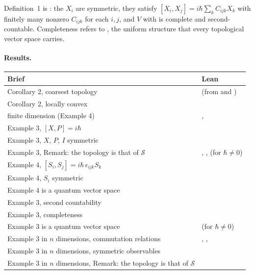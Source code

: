 \documentclass[11pt]{article}
\begin{document}
Definition~1 is : the $X_i$ are symmetric, they satisfy
$[X_i, X_j] = i\hbar \sum_k C_{ijk} X_k$ with finitely many nonzero $C_{ijk}$ for each $i, j$,
and $V$ with  is complete and second-countable. Completeness refers to
, the uniform structure that every topological vector space carries.

\paragraph{Results.}
\begin{xltabular}{\textwidth}{@{}BL@{}}
\toprule
Brief & Lean \\
\midrule
\endhead
Corollary 2, coarsest topology &  (from 
  and ) \\
Corollary 2, locally convex &  \\
finite dimension (Example 4) & ,  \\
Example 3, $[X, P] = i\hbar$ &  \\
Example 3, $X$, $P$, $I$ symmetric &  \\
Example 3, Remark: the topology is that of $\mathcal{S}$ & ,
  ,  (for $\hbar \ne 0$) \\
Example 4, $[S_i, S_j] = i\hbar\,\epsilon_{ijk} S_k$ &  \\
Example 4, $S_i$ symmetric &  \\
Example 4 is a quantum vector space &  \\
Example 3, second countability &  \\
Example 3, completeness &  \\
Example 3 is a quantum vector space &  (for
  $\hbar \ne 0$) \\
Example 3 in $n$ dimensions, commutation relations & ,
  ,  \\
Example 3 in $n$ dimensions, symmetric observables &  \\
Example 3 in $n$ dimensions, Remark: the topology is that of $\mathcal{S}$ &

\end{xltabular}
\end{document}
